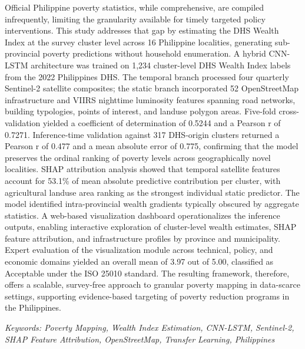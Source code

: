 \documentclass[12pt, letterpaper]{article}
\numberwithin{figure}{section}
\numberwithin{table}{section}
\begin{document}
 \noindent
Official Philippine poverty statistics, while comprehensive, are
compiled infrequently, limiting the granularity
available for timely targeted policy interventions. This study addresses
that gap by estimating the DHS Wealth Index at the survey cluster
level across 16 Philippine localities,
generating sub-provincial poverty predictions without household
enumeration. A hybrid CNN-LSTM architecture was trained on 1,234
cluster-level DHS Wealth Index labels from the 2022 Philippines DHS.
The temporal branch processed four quarterly Sentinel-2 satellite
composites; the static branch incorporated 52 OpenStreetMap
infrastructure and VIIRS nighttime luminosity features spanning road
networks, building typologies, points of interest, and landuse
polygon areas. Five-fold cross-validation yielded a coefficient of
determination of 0.5244 and a Pearson r of 0.7271. Inference-time
validation against 317 DHS-origin clusters returned a Pearson r of
0.477 and a mean absolute error of 0.775, confirming that the model
preserves the ordinal ranking of poverty levels across geographically
novel localities. SHAP attribution analysis showed that temporal
satellite features account for 53.1\% of mean absolute predictive
contribution per cluster, with agricultural landuse area ranking as
the strongest individual static predictor. The model identified
intra-provincial wealth gradients typically obscured by aggregate
statistics. A web-based visualization dashboard operationalizes the
inference outputs, enabling interactive exploration of cluster-level
wealth estimates, SHAP feature attribution, and infrastructure
profiles by province and municipality. Expert evaluation of the
visualization module across technical, policy, and economic domains
yielded an overall mean of 3.97 out of 5.00, classified as Acceptable
under the ISO 25010 standard. The resulting framework, therefore,
offers a scalable, survey-free approach to granular poverty mapping
in data-scarce settings, supporting evidence-based targeting of
poverty reduction programs in the Philippines.

\vfill %

\noindent
\textit{Keywords: Poverty Mapping, Wealth Index Estimation, CNN-LSTM,
  Sentinel-2, SHAP Feature Attribution, OpenStreetMap, Transfer
Learning, Philippines}

\tableofcontents
\newpage %

\cleardoublepage
{}
\listoffigures
\end{document}
